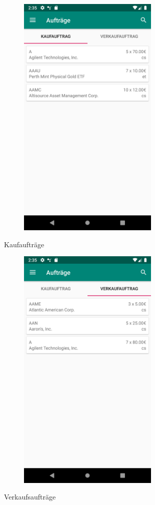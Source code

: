 \documentclass[10pt]{scrartcl}
\begin{document}
\begin{figure}[H]
	\centering
	\includegraphics[width=0.6\textwidth]{Bilder/Applikation/Kaufauftrag.png}
\end{figure}
Kaufaufträge

\begin{figure}[H]
	\centering
	\includegraphics[width=0.6\textwidth]{Bilder/Applikation/Verkaufauftrag.png}
\end{figure}
Verkaufsaufträge
\end{document}

